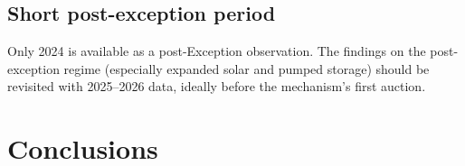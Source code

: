 \documentclass[11pt,a4paper]{article}
\begin{document}
\subsection{Short post-exception period}

Only 2024 is available as a post-Exception observation. The findings on the
post-exception regime (especially expanded solar and pumped storage) should be
revisited with 2025--2026 data, ideally before the mechanism's first auction.

\section{Conclusions}
\end{document}
